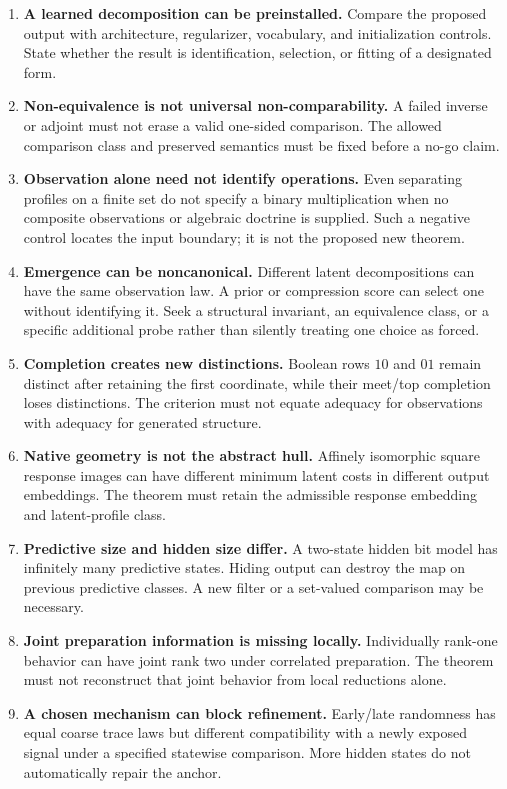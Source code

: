 \documentclass[11pt]{article}
\theoremstyle{remark}
\begin{document}
\begin{enumerate}
\item \textbf{A learned decomposition can be preinstalled.} Compare the proposed output with architecture, regularizer, vocabulary, and initialization controls. State whether the result is identification, selection, or fitting of a designated form.
\item \textbf{Non-equivalence is not universal non-comparability.} A failed inverse or adjoint must not erase a valid one-sided comparison. The allowed comparison class and preserved semantics must be fixed before a no-go claim.
\item \textbf{Observation alone need not identify operations.} Even separating profiles on a finite set do not specify a binary multiplication when no composite observations or algebraic doctrine is supplied. Such a negative control locates the input boundary; it is not the proposed new theorem.
\item \textbf{Emergence can be noncanonical.} Different latent decompositions can have the same observation law. A prior or compression score can select one without identifying it. Seek a structural invariant, an equivalence class, or a specific additional probe rather than silently treating one choice as forced.
\item \textbf{Completion creates new distinctions.} Boolean rows $10$ and $01$ remain distinct after retaining the first coordinate, while their meet/top completion loses distinctions. The criterion must not equate adequacy for observations with adequacy for generated structure.
\item \textbf{Native geometry is not the abstract hull.} Affinely isomorphic square response images can have different minimum latent costs in different output embeddings. The theorem must retain the admissible response embedding and latent-profile class.
\item \textbf{Predictive size and hidden size differ.} A two-state hidden bit model has infinitely many predictive states. Hiding output can destroy the map on previous predictive classes. A new filter or a set-valued comparison may be necessary.
\item \textbf{Joint preparation information is missing locally.} Individually rank-one behavior can have joint rank two under correlated preparation. The theorem must not reconstruct that joint behavior from local reductions alone.
\item \textbf{A chosen mechanism can block refinement.} Early/late randomness has equal coarse trace laws but different compatibility with a newly exposed signal under a specified statewise comparison. More hidden states do not automatically repair the anchor.

\end{enumerate}
\end{document}
